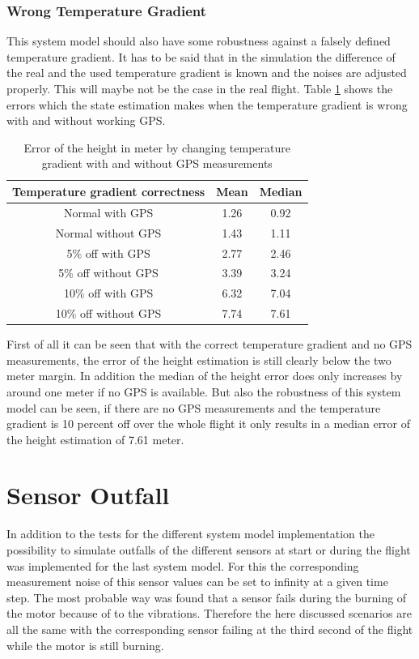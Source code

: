 \subsubsection{Wrong Temperature Gradient}
This system model should also have some robustness against a falsely defined temperature gradient.
It has to be said that in the simulation the difference of the real and the used temperature gradient is known and the noises are adjusted properly.
This will maybe not be the case in the real flight.
Table \ref{tab:ErrorChangingTempGradWithWithoutGPS} shows the errors which the state estimation makes when the temperature gradient is wrong with and without working GPS.

\begin{table}[h!]
\centering
\begin{tabular}{ccc}
\hline
\multicolumn{1}{|c|}{Temperature gradient correctness} & \multicolumn{1}{|c|}{Mean}& \multicolumn{1}{|c|}{Median} \\ \hline
Normal with GPS 	& 1.26 		& 0.92\\
Normal without GPS	& 1.43	 	& 1.11\\
5\% off with GPS 	& 2.77	 	& 2.46\\
5\% off without GPS 	& 3.39	 	& 3.24\\
10\% off with GPS 	& 6.32	 	& 7.04\\
10\% off without GPS 	& 7.74 		& 7.61
\end{tabular}
\caption{Error of the height in meter by changing temperature gradient with and without GPS measurements}
\label{tab:ErrorChangingTempGradWithWithoutGPS}
\end{table}

First of all it can be seen that with the correct temperature gradient and no GPS measurements,
the error of the height estimation is still clearly below the two meter margin.
In addition the median of the height error does only increases by around one meter if no GPS is available.
But also the robustness of this system model can be seen, if there are no GPS measurements
and the temperature gradient is 10 percent off over the whole flight it only results in a median error of the height estimation of 7.61 meter.

\newpage
\section{Sensor Outfall}
In addition to the tests for the different system model implementation
the possibility to simulate outfalls of the different sensors at start or during the flight was implemented for the last system model.
For this the corresponding measurement noise of this sensor values can be set to infinity at a given time step.
The most probable way was found that a sensor fails during the burning of the motor because of to the vibrations.
Therefore the here discussed scenarios are all the same with the corresponding sensor failing at the third second of the flight while the motor is still burning.

